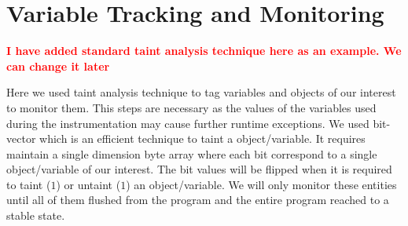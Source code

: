 \doublespacing

\section{Variable Tracking and Monitoring}
\label{subsec:taint}

\textcolor{red}{\textbf{I have added standard taint analysis technique here as an example. We can change it later}}\newline


Here we used taint analysis technique to tag variables and objects of our interest to monitor them. 
This steps are necessary as the values of the variables used during the instrumentation may cause further runtime exceptions. 
We used bit-vector which is an efficient technique to taint a object/variable. 
It requires maintain a single dimension byte array where each bit correspond to a single object/variable of our interest. 
The bit values will be flipped when it is required to taint ($1$) or untaint ($1$) an object/variable. 
We will only monitor these entities until all of them flushed from the program and the entire program reached to a stable state.
